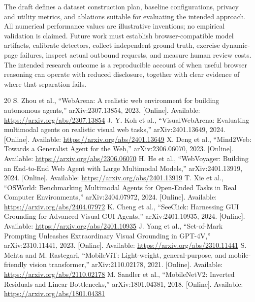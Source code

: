 \documentclass[conference]{IEEEtran}
\begin{document}
The draft defines a dataset construction plan, baseline configurations, privacy and utility metrics, and ablations suitable for evaluating the intended approach. All numerical performance values are illustrative inventions; no empirical validation is claimed. Future work must establish browser-compatible model artifacts, calibrate detectors, collect independent ground truth, exercise dynamic-page failures, inspect actual outbound requests, and measure human review costs. The intended research outcome is a reproducible account of when useful browser reasoning can operate with reduced disclosure, together with clear evidence of where that separation fails.

\clearpage
\onecolumn
\begin{thebibliography}{20}
\fontsize{9.5}{11.5}\selectfont
\setlength{\itemsep}{7.5pt}
\setlength{\parskip}{0pt}
 S. Zhou et al., ``WebArena: A realistic web environment for building autonomous agents,'' arXiv:2307.13854, 2023. [Online]. Available: \url{https://arxiv.org/abs/2307.13854}
 J. Y. Koh et al., ``VisualWebArena: Evaluating multimodal agents on realistic visual web tasks,'' arXiv:2401.13649, 2024. [Online]. Available: \url{https://arxiv.org/abs/2401.13649}
 X. Deng et al., ``Mind2Web: Towards a Generalist Agent for the Web,'' arXiv:2306.06070, 2023. [Online]. Available: \url{https://arxiv.org/abs/2306.06070}
 H. He et al., ``WebVoyager: Building an End-to-End Web Agent with Large Multimodal Models,'' arXiv:2401.13919, 2024. [Online]. Available: \url{https://arxiv.org/abs/2401.13919}
 T. Xie et al., ``OSWorld: Benchmarking Multimodal Agents for Open-Ended Tasks in Real Computer Environments,'' arXiv:2404.07972, 2024. [Online]. Available: \url{https://arxiv.org/abs/2404.07972}
 K. Cheng et al., ``SeeClick: Harnessing GUI Grounding for Advanced Visual GUI Agents,'' arXiv:2401.10935, 2024. [Online]. Available: \url{https://arxiv.org/abs/2401.10935}
 J. Yang et al., ``Set-of-Mark Prompting Unleashes Extraordinary Visual Grounding in GPT-4V,'' arXiv:2310.11441, 2023. [Online]. Available: \url{https://arxiv.org/abs/2310.11441}
 S. Mehta and M. Rastegari, ``MobileViT: Light-weight, general-purpose, and mobile-friendly vision transformer,'' arXiv:2110.02178, 2021. [Online]. Available: \url{https://arxiv.org/abs/2110.02178}
 M. Sandler et al., ``MobileNetV2: Inverted Residuals and Linear Bottlenecks,'' arXiv:1801.04381, 2018. [Online]. Available: \url{https://arxiv.org/abs/1801.04381}

\end{thebibliography}
\end{document}
